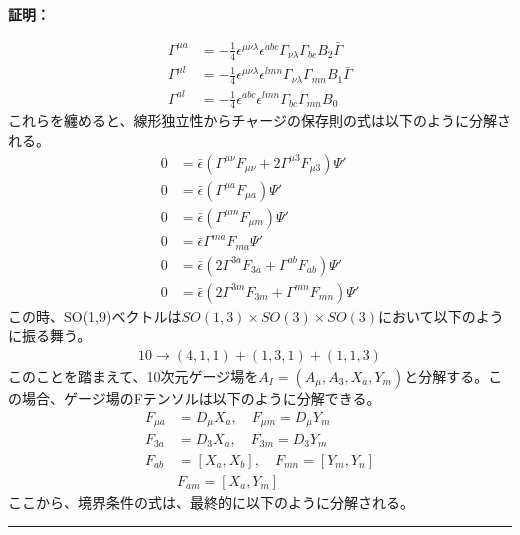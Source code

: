 \documentclass[dvipdfmx,a4paper,10.5pt]{article}
\numberwithin{equation}{section}
\newenvironment{proofbox}
{\begin{prooflabel}\textbf{証明：}\end{prooflabel}\vspace{0.8em}}
{\par\vspace{1em}\hrule\vspace{1em}}
\begin{document}
\begin{proofbox}
\begin{equation}\begin{split}
    \Gamma^{\mu a}&=-\frac{1}{4}\epsilon^{\mu\nu\lambda}\epsilon^{abc}\Gamma_{\nu\lambda}\Gamma_{bc}B_{2}\bar{\Gamma}\\
    \Gamma^{\mu l}&=-\frac{1}{4}\epsilon^{\mu\nu\lambda}\epsilon^{lmn}\Gamma_{\nu\lambda}\Gamma_{mn}B_{1}\bar{\Gamma}\\
    \Gamma^{al}&=-\frac{1}{4}\epsilon^{abc}\epsilon^{lmn}\Gamma_{bc}\Gamma_{mn}B_{0}
\end{split} \end{equation}
これらを纏めると、線形独立性からチャージの保存則の式は以下のように分解される。
\begin{equation}\begin{split}
    0&=\bar{\epsilon}(\Gamma^{\mu\nu}F_{\mu\nu}+2\Gamma^{\mu3}F_{\mu3})\Psi'\\
    0&=\bar{\epsilon}(\Gamma^{\mu a}F_{\mu a})\Psi'\\
    0&=\bar{\epsilon}(\Gamma^{\mu m}F_{\mu m})\Psi'\\
    0&=\bar{\epsilon}\Gamma^{m a}F_{ma}\Psi'\\
    0&=\bar{\epsilon}(2\Gamma^{3a}F_{3a}+\Gamma^{ab}F_{ab})\Psi'\\
    0&=\bar{\epsilon}(2\Gamma^{3m}F_{3m}+\Gamma^{mn}F_{mn})\Psi'
\end{split} \end{equation}
この時、SO(1,9)ベクトルは$SO(1,3)\times SO(3)\times SO(3)$において以下のように振る舞う。
\begin{equation}\begin{split}
    10 \to (4,1,1)+(1,3,1)+(1,1,3)
\end{split} \end{equation}
このことを踏まえて、10次元ゲージ場を$A_{I}=(A_{\mu},A_{3},X_{a},Y_{m})$と分解する。この場合、ゲージ場のFテンソルは以下のように分解できる。
\begin{equation}\begin{split}
    F_{\mu a}&=D_{\mu}X_{a},\quad
    F_{\mu m}=D_{\mu}Y_{m}\\
    F_{3 a}&=D_{3}X_{a},\quad
    F_{3 m}=D_{3}Y_{m}\\
    F_{ab}&=[X_{a},X_{b}],\quad F_{mn}=[Y_{m},Y_{n}]\\
    &F_{am}=[X_{a},Y_{m}]
\end{split} \end{equation}
ここから、境界条件の式は、最終的に以下のように分解される。
\begin{equation}\label{b.c. con}

\end{equation}
\end{proofbox}
\end{document}
